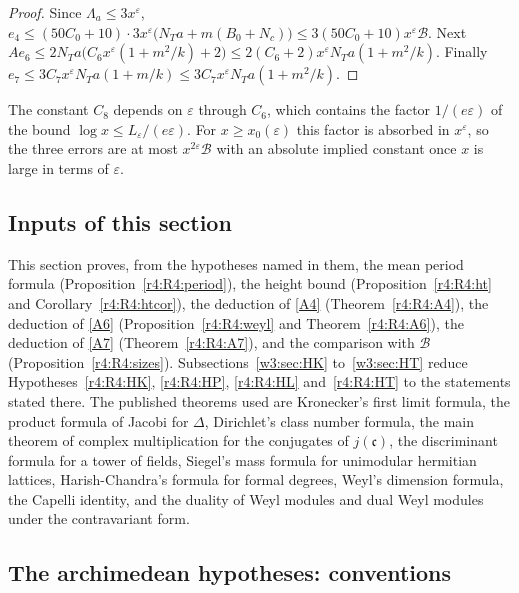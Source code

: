 \begin{proof}
Since $\Lambda_a\le3x^\varepsilon$, $e_4\le(50C_0+10)\cdot3x^\varepsilon\big(N_Ta+m(B_0+N_c)\big)\le3(50C_0+10)x^\varepsilon\mathcal B$. Next $Ae_6\le2N_Ta\big(C_6x^\varepsilon(1+m^2/k)+2\big)\le2(C_6+2)x^\varepsilon N_Ta(1+m^2/k)$. Finally $e_7\le3C_7x^\varepsilon N_Ta(1+m/k)\le3C_7x^\varepsilon N_Ta(1+m^2/k)$.
\end{proof}

The constant $C_8$ depends on $\varepsilon$ through $C_6$, which contains the factor $1/(e\varepsilon)$ of the bound $\log x\le L_\varepsilon/(e\varepsilon)$. For $x\ge x_0(\varepsilon)$ this factor is absorbed in $x^{\varepsilon}$, so the three errors are at most $x^{2\varepsilon}\mathcal B$ with an absolute implied constant once $x$ is large in terms of $\varepsilon$.

\subsection{Inputs of this section}\label{r4:sec:R4open}

This section proves, from the hypotheses named in them, the mean period formula (Proposition~\ref{r4:R4:period}), the height bound (Proposition~\ref{r4:R4:ht} and Corollary~\ref{r4:R4:htcor}), the deduction of \eqref{A4} (Theorem~\ref{r4:R4:A4}), the deduction of \eqref{A6} (Proposition~\ref{r4:R4:weyl} and Theorem~\ref{r4:R4:A6}), the deduction of \eqref{A7} (Theorem~\ref{r4:R4:A7}), and the comparison with $\mathcal B$ (Proposition~\ref{r4:R4:sizes}). Subsections~\ref{w3:sec:HK} to~\ref{w3:sec:HT} reduce Hypotheses~\ref{r4:R4:HK}, \ref{r4:R4:HP}, \ref{r4:R4:HL} and~\ref{r4:R4:HT} to the statements stated there.  The published theorems used are Kronecker's first limit formula, the product formula of Jacobi for $\Delta$, Dirichlet's class number formula, the main theorem of complex multiplication for the conjugates of $j(\mathfrak c)$, the discriminant formula for a tower of fields, Siegel's mass formula for unimodular hermitian lattices, Harish-Chandra's formula for formal degrees, Weyl's dimension formula, the Capelli identity, and the duality of Weyl modules and dual Weyl modules under the contravariant form.

\subsection{The archimedean hypotheses: conventions}\label{w3:sec:conv}

